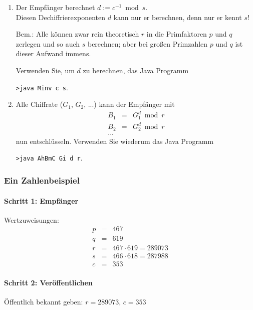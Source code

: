 \begin{enumerate}[label={\alph*)}]

\item Der Empfänger berechnet \(d := c^{-1} \bmod s\).\\

Diesen Dechiffrierexponenten \(d\) kann nur er berechnen, denn nur er
kennt \(s\)!

Bem.: Alle können zwar rein theoretisch \(r\) in die Primfaktoren
\(p\) und \(q\) zerlegen und so auch \(s\) berechnen; aber bei großen
Primzahlen \(p\) und \(q\) ist dieser Aufwand immens.

Verwenden Sie, um \(d\) zu berechnen, das Java Programm

\texttt{>java Minv c s}.

\item Alle Chiffrate (\(G_1\), \(G_2\), ...) kann der Empfänger mit
  \begin{eqnarray*}
	B_1 &=& G_1^d \bmod r \\
	B_2 &=& G_2^d \bmod r \\
	...
  \end{eqnarray*}
nun entschlüsseln. Verwenden Sie wiederum das Java Programm

\texttt{>java AhBmC Gi d r}.


\end{enumerate}

\subsubsection{Ein Zahlenbeispiel}

\paragraph{Schritt 1: Empfänger}
Wertzuweisungen:
\begin{eqnarray*}
	p &=& 467 \\
	q &=& 619 \\
	r &=& 467\cdot 619 = 289073 \\
	s &=& 466\cdot 618 = 287988 \\
	c &=& 353
\end{eqnarray*}


\paragraph{Schritt 2: Veröffentlichen}
Öffentlich bekannt geben: \(r = 289073\), \(c = 353\)

